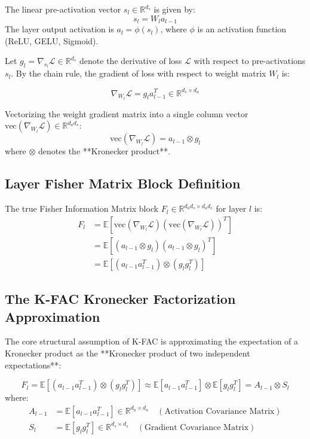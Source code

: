 The linear pre-activation vector $s_l \in \mathbb{R}^{d_s}$ is given by:
\begin{equation}
s_l = W_l a_{l-1}
\end{equation}
The layer output activation is $a_l = \phi(s_l)$, where $\phi$ is an activation function (ReLU, GELU, Sigmoid).

Let $g_l = \nabla_{s_l} \mathcal{L} \in \mathbb{R}^{d_s}$ denote the derivative of loss $\mathcal{L}$ with respect to pre-activations $s_l$. By the chain rule, the gradient of loss with respect to weight matrix $W_l$ is:

\begin{equation}
\nabla_{W_l} \mathcal{L} = g_l a_{l-1}^T \in \mathbb{R}^{d_s \times d_a}
\end{equation}

Vectorizing the weight gradient matrix into a single column vector $\text{vec}(\nabla_{W_l} \mathcal{L}) \in \mathbb{R}^{d_a d_s}$:
\begin{equation}
\text{vec}(\nabla_{W_l} \mathcal{L}) = a_{l-1} \otimes g_l
\end{equation}
where $\otimes$ denotes the **Kronecker product**.

\subsection{Layer Fisher Matrix Block Definition}
The true Fisher Information Matrix block $F_l \in \mathbb{R}^{d_a d_s \times d_a d_s}$ for layer $l$ is:
\begin{align}
F_l &= \mathbb{E} \left[ \text{vec}(\nabla_{W_l} \mathcal{L}) \left( \text{vec}(\nabla_{W_l} \mathcal{L}) \right)^T \right] \\
&= \mathbb{E} \left[ (a_{l-1} \otimes g_l) (a_{l-1} \otimes g_l)^T \right] \\
&= \mathbb{E} \left[ (a_{l-1} a_{l-1}^T) \otimes (g_l g_l^T) \right]
\end{align}

\subsection{The K-FAC Kronecker Factorization Approximation}
The core structural assumption of K-FAC is approximating the expectation of a Kronecker product as the **Kronecker product of two independent expectations**:

\begin{mathbox}
\begin{equation}
F_l = \mathbb{E} \left[ (a_{l-1} a_{l-1}^T) \otimes (g_l g_l^T) \right] \approx \mathbb{E} \left[ a_{l-1} a_{l-1}^T \right] \otimes \mathbb{E} \left[ g_l g_l^T \right] = A_{l-1} \otimes S_l
\end{equation}
where:
\begin{align}
A_{l-1} &= \mathbb{E} \left[ a_{l-1} a_{l-1}^T \right] \in \mathbb{R}^{d_a \times d_a} \quad (\text{Activation Covariance Matrix}) \\
S_l &= \mathbb{E} \left[ g_l g_l^T \right] \in \mathbb{R}^{d_s \times d_s} \quad (\text{Gradient Covariance Matrix})
\end{align}
\end{mathbox}


